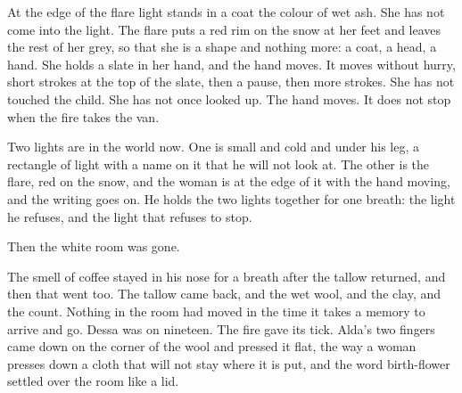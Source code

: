 At the edge of the flare light  stands in a coat the colour of wet ash. She has not come into the light. The flare puts a red rim on the snow at her feet and leaves the rest of her grey, so that she is a shape and nothing more: a coat, a head, a hand. She holds a slate in her hand, and the hand moves. It moves without hurry, short strokes at the top of the slate, then a pause, then more strokes. She has not touched the child. She has not once looked up. The hand moves. It does not stop when the fire takes the van.

Two lights are in the world now. One is small and cold and under his leg, a rectangle of light with a name on it that he will not look at. The other is the flare, red on the snow, and the woman is at the edge of it with the hand moving, and the writing goes on. He holds the two lights together for one breath: the light he refuses, and the light that refuses to stop.

Then the white room was gone.

The smell of coffee stayed in his nose for a breath after the tallow returned, and then that went too. The tallow came back, and the wet wool, and the clay, and the count. Nothing in the room had moved in the time it takes a memory to arrive and go. Dessa was on nineteen. The fire gave its tick. Alda's two fingers came down on the corner of the wool and pressed it flat, the way a woman presses down a cloth that will not stay where it is put, and the word birth-flower settled over the room like a lid.
